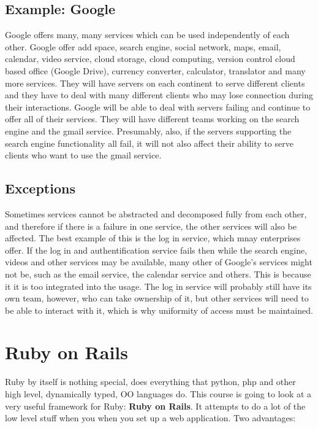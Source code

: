 \documentclass[11pt]{article}
\begin{document}
\subsection{Example: Google}

Google offers many, many services which can be used independently of each other. Google offer add space, search engine, social network, maps, email, calendar, video service, cloud storage, cloud computing, version control cloud based office (Google Drive), currency converter, calculator, translator and many more services. They will have servers on each continent to serve different clients and they have to deal with many different clients who may lose connection during their interactions. Google will be able to deal with servers failing and continue to offer all of their services. They will have different teams working on the search engine and the gmail service. Presumably, also, if the servers supporting the search engine functionality all fail, it will not also affect their ability to serve clients who want to use the gmail service.

\subsection{Exceptions}

Sometimes services cannot be abstracted and decomposed fully from each other, and therefore if there is a failure in one service, the other services will also be affected. The best example of this is the log in service, which mnay enterprises offer. If the log in and authentification service fails then while the search engine, videos and other services may be available, many other of Google's services might not be, such as the email service, the calendar service and others. This is because it it is too integrated into the usage. The log in service will probably still have its own team, however, who can take ownership of it, but other services will need to be able to interact with it, which is why uniformity of access must be maintained.



\section{Ruby on Rails}

Ruby by itself is nothing special, does everything that python, php and other high level, dynamically typed, OO languages do. This course is going to look at a very useful framework for Ruby: \textbf{Ruby on Rails}. It attempts to do a lot of the low level stuff when you when you set up a web application. Two advantages:
\end{document}
